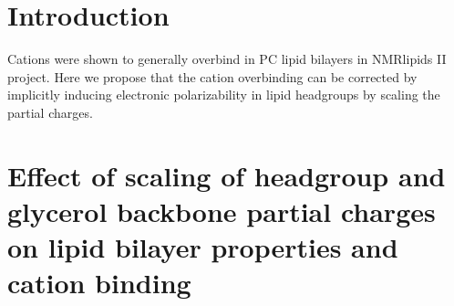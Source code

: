 \documentclass[aps,prl,superscriptaddress,twocolumn]{revtex4}
\begin{document}

\maketitle %



\section{Introduction}

Cations were shown to generally overbind in PC lipid bilayers in
NMRlipids II project. Here we propose that the cation overbinding can
be corrected by implicitly inducing electronic polarizability in
lipid headgroups by scaling the partial charges.



\section{Effect of scaling of headgroup and glycerol backbone partial charges on lipid bilayer properties and cation binding}
\end{document}
